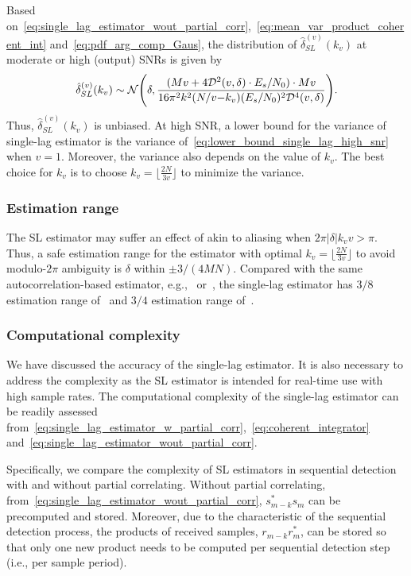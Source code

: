 Based on~\eqref{eq:single_lag_estimator_wout_partial_corr},~\eqref{eq:mean_var_product_coherent_int}
and~\eqref{eq:pdf_arg_comp_Gaus},
the distribution of $\hat{\delta}_{SL}^{(v)}(k_v)$ at moderate or high
(output) SNRs is given by
\begin{equation}
  \label{eq:lower_bound_single_lag_high_snr}
  \hat{\delta}_{SL}^{(v)}(k_v) \sim \mathcal{N} \Bigg(\delta,\frac{(Mv+4\mathcal{D}^2(v,\delta)\cdot E_s/N_0)\cdot Mv}{16\pi^2k^2(N/v{-}k_v)(E_s/N_0)^2\mathcal{D}^4(v,\delta)}\Bigg).
\end{equation}
Thus, $\hat{\delta}_{SL}^{(v)}(k_v)$ is unbiased. 
At high SNR, a lower bound for the variance of single-lag estimator is 
the variance of~\eqref{eq:lower_bound_single_lag_high_snr} when $v=1$.
Moreover, the variance also depends on
the value of $k_v$.
The best choice for $k_v$ is to choose 
$k_v=\lfloor\frac{2N}{3v}\rfloor$ to minimize the variance.

\subsubsection{Estimation range}
The SL estimator may suffer an effect
of akin to aliasing when  $2\pi |\delta|k_vv{>}\pi$.
Thus, a safe estimation range for the estimator with optimal
$k_v=\lfloor\frac{2N}{3v}\rfloor$
to avoid modulo-$2\pi$ ambiguity
is $\delta$ within $\pm 3/(4MN)$.
Compared with the same autocorrelation-based estimator,
e.g.,~\cite{Luise_Reggiannini_95} or~\cite{Fitz_94},
the single-lag estimator has 
$3/8$ estimation range of~\cite{Luise_Reggiannini_95} and $3/4$ estimation range of~\cite{Fitz_94}.

\subsubsection{Computational complexity}

We have discussed the accuracy of the single-lag estimator.
It is also necessary to address the complexity as the SL estimator
is intended for real-time use with high sample rates.
The computational complexity of the single-lag estimator 
can be readily assessed
from~\eqref{eq:single_lag_estimator_w_partial_corr},~\eqref{eq:coherent_integrator}
and~\eqref{eq:single_lag_estimator_wout_partial_corr}.

Specifically, we compare the complexity of SL estimators in sequential detection with and without partial correlating.
Without partial correlating, from~\eqref{eq:single_lag_estimator_wout_partial_corr},
$s_{m-k}^*s_m$ can be precomputed and stored.
Moreover, due to the characteristic of the sequential detection
process,
the products of received samples, $r_{m-k}r_m^*$,
can be stored so that only one new product needs to be computed per
sequential detection step (i.e., per sample period).

